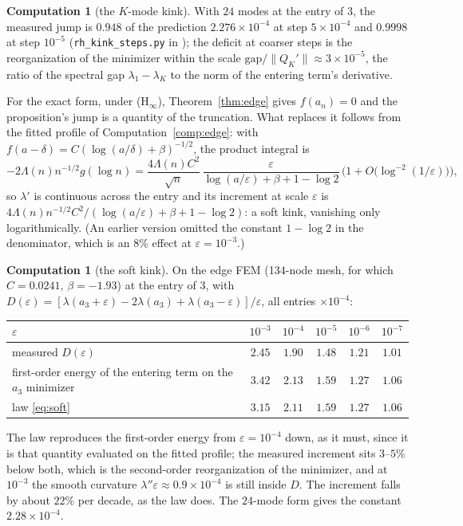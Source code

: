 \documentclass[11pt]{article}
\theoremstyle{definition}
\newtheorem{computation}[theorem]{Computation}
\theoremstyle{remark}
\begin{document}
\begin{computation}[the $K$-mode kink]\label{comp:kink}
With $24$ modes at the entry of $3$, the measured jump is $0.948$ of the prediction $2.276\times10^{-4}$ at step $5\times10^{-4}$ and $0.9998$ at step $10^{-5}$ (\texttt{rh\_kink\_steps.py} in \cite{michaels-repo}); the deficit at coarser steps is the reorganization of the minimizer within the scale $\text{gap}/\|Q_K'\|\approx3\times10^{-5}$, the ratio of the spectral gap $\lambda_1-\lambda_K$ to the norm of the entering term's derivative.
\end{computation}

For the exact form, under (H$_\infty$), Theorem~\ref{thm:edge} gives $f(a_n)=0$ and the proposition's jump is a quantity of the truncation. What replaces it follows from the fitted profile of Computation~\ref{comp:edge}: with $f(a-\delta)=C(\log(a/\delta)+\beta)^{-1/2}$, the product integral is
\begin{equation}\label{eq:soft}
-2\Lambda(n)n^{-1/2}g(\log n)=\frac{4\Lambda(n)C^2}{\sqrt n}\,\frac{\varepsilon}{\log(a/\varepsilon)+\beta+1-\log2}\,\Big(1+O\big(\log^{-2}(1/\varepsilon)\big)\Big),
\end{equation}
so $\lambda'$ is continuous across the entry and its increment at scale $\varepsilon$ is $4\Lambda(n)n^{-1/2}C^2/(\log(a/\varepsilon)+\beta+1-\log2)$: a soft kink, vanishing only logarithmically. (An earlier version omitted the constant $1-\log2$ in the denominator, which is an $8\%$ effect at $\varepsilon=10^{-3}$.)

\begin{computation}[the soft kink]\label{comp:soft}
On the edge FEM (134-node mesh, for which $C=0.0241$, $\beta=-1.93$) at the entry of $3$, with $D(\varepsilon)=[\lambda(a_3+\varepsilon)-2\lambda(a_3)+\lambda(a_3-\varepsilon)]/\varepsilon$, all entries $\times10^{-4}$:
\begin{center}
\begin{tabular}{@{}lccccc@{}}
\toprule
$\varepsilon$ & $10^{-3}$ & $10^{-4}$ & $10^{-5}$ & $10^{-6}$ & $10^{-7}$\\
\midrule
measured $D(\varepsilon)$ & $2.45$ & $1.90$ & $1.48$ & $1.21$ & $1.01$\\
first-order energy of the entering term on the $a_3$ minimizer & $3.42$ & $2.13$ & $1.59$ & $1.27$ & $1.06$\\
law \eqref{eq:soft} & $3.15$ & $2.11$ & $1.59$ & $1.27$ & $1.06$\\
\bottomrule
\end{tabular}
\end{center}
The law reproduces the first-order energy from $\varepsilon=10^{-4}$ down, as it must, since it is that quantity evaluated on the fitted profile; the measured increment sits $3$--$5\%$ below both, which is the second-order reorganization of the minimizer, and at $10^{-3}$ the smooth curvature $\lambda''\varepsilon\approx0.9\times10^{-4}$ is still inside $D$. The increment falls by about $22\%$ per decade, as the law does. The $24$-mode form gives the constant $2.28\times10^{-4}$.
\end{computation}
\end{document}

